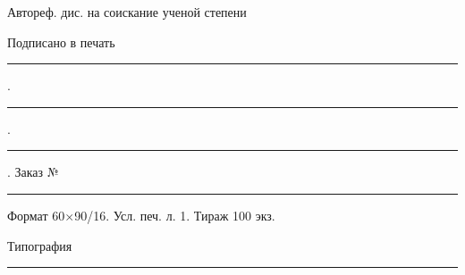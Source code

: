 \documentclass[a5paper,10pt,twoside,openany,article]{memoir}
\begin{document}




\newpage
\thispagestyle{empty}
\vspace*{0pt plus1fill}
\small
\begin{center}
    \textit{\thesisAuthor}
    \par\medskip

    \thesisTitle
    \par\medskip

    Автореф. дис. на соискание ученой степени \thesisDegreeShort
    \par\bigskip

    Подписано в печать \rule{2em}{0.4pt}.\rule{2em}{0.4pt}.\rule{4em}{0.4pt}.
    Заказ № \rule{5em}{0.4pt}

    Формат 60\(\times\)90/16. Усл. печ. л. 1. Тираж 100 экз.

    Типография \rule{0.5\linewidth}{0.4pt}
\end{center}
\end{document}
